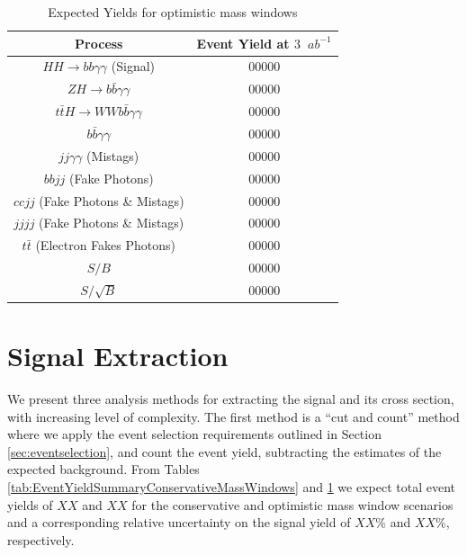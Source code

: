 \documentclass{cmspaper}
\begin{document}
\begin{table}[!ht]
\begin{center} 
\begin{tabular}{|c|c|}
\hline 
Process                                              &  Event Yield at $3$~$ab^{-1}$ \\  \hline
$HH \rightarrow bb\gamma\gamma$ (Signal)             &  00000                     \\  \hline
$ZH \rightarrow b\bar{b}\gamma\gamma$                &  00000                     \\  
$t\bar{t}H \rightarrow W W b \bar{b}\gamma\gamma$    &  00000                     \\  \hline
$b \bar{b} \gamma\gamma$                             &  00000                     \\  
$jj \gamma\gamma$ (Mistags)                          &  00000                     \\  
$bb jj$ (Fake Photons)                               &  00000                     \\  
$cc jj$ (Fake Photons \& Mistags)                    &  00000                     \\  
$jjjj$  (Fake Photons \& Mistags)                    &  00000                     \\  \hline
$t\bar{t}$ (Electron Fakes Photons)                  &  00000                     \\  \hline
\hline
$S/B$                                                &  00000                     \\  \hline
$S/\sqrt{B}$                                         &  00000                     \\  \hline

\end{tabular}
\caption{Expected Yields for optimistic mass windows }
\label{tab:EventYieldSummaryOptimisticMassWindows}
\end{center}
\end{table}
 


\section{Signal Extraction}
\label{sec:signalextraction}

We present three analysis methods for extracting the signal and its cross section, with increasing
level of complexity. The first method is a ``cut and count'' method where we apply
the event selection requirements outlined in Section \ref{sec:eventselection}, 
and count the event yield, subtracting the estimates of the expected background. From Tables
\ref{tab:EventYieldSummaryConservativeMassWindows} and \ref{tab:EventYieldSummaryOptimisticMassWindows}
we expect total event yields of $XX$ and $XX$ for the conservative and optimistic mass window scenarios
and a corresponding relative uncertainty on the signal yield of $XX\%$ and $XX\%$, respectively.
\end{document}
